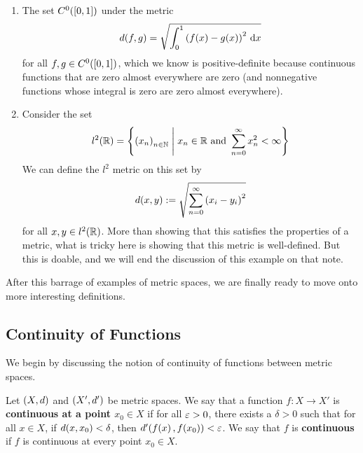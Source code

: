 \begin{boxexample}
\begin{enumerate}
        \item The set $C^0\!\left( \left[ 0, 1 \right] \right)$ under the metric
        \begin{align*}
            d(f, g) = \sqrt{\int_{0}^{1} \left( f(x) - g(x) \right)^2 \, \operatorname{d}\!x}
        \end{align*}
        for all $f, g \in C^0\!\left( \left[ 0, 1 \right] \right)$, which we know is positive-definite because continuous functions that are zero almost everywhere are zero (and nonnegative functions whose integral is zero are zero almost everywhere).

        \item Consider the set
        \begin{align*}
            l^2\!\left( \mathbb{R} \right) = \left\{ \left( x_n \right)_{n \in \mathbb{N}} \; \middle\vert \; x_n \in \mathbb{R} \text{ and } \sum_{n=0}^{\infty} x_n^2 < \infty \right\}
        \end{align*}
        We can define the $l^2$ metric on this set by
        \begin{align*}
            d(x, y) := \sqrt{\sum_{n=0}^{\infty} \left( x_i - y_i \right)^2}
        \end{align*}
        for all $x, y \in l^2\!\left( \mathbb{R} \right)$. More than showing that this satisfies the properties of a metric, what is tricky here is showing that this metric is well-defined. But this is doable, and we will end the discussion of this example on that note.
    \end{enumerate}
\end{boxexample}

After this barrage of examples of metric spaces, we are finally ready to move onto more interesting definitions.

\subsection{Continuity of Functions}

We begin by discussing the notion of continuity of functions between metric spaces.

\begin{boxdefinition}[Continuity]\label{Ch1:Def:Continuity_Metric}
    Let $\left( X, d \right)$ and $\left( X', d' \right)$ be metric spaces. We say that a function $f : X \to X'$ is \textbf{continuous at a point $x_0 \in X$} if for all $\varepsilon > 0$, there exists a $\delta > 0$ such that for all $x \in X$, if $d\!\left( x, x_0 \right) < \delta$, then $d'\!\left( f\!\left( x \right), f\!\left( x_0 \right) \right) < \varepsilon$. We say that $f$ is \textbf{continuous} if $f$ is continuous at every point $x_0 \in X$.
\end{boxdefinition}


